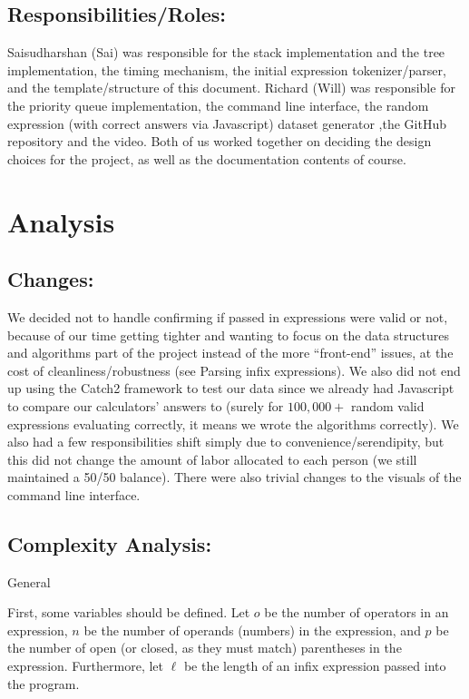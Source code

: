 \documentclass[11pt]{article}
\begin{document}
\subsection*{Responsibilities/Roles:}
Saisudharshan (Sai) was responsible for the stack implementation and the tree implementation, the timing mechanism, the initial expression tokenizer/parser, and the template/structure of this document.
Richard (Will) was responsible for the priority queue implementation, the command line interface, the random expression (with correct answers via Javascript) dataset generator ,the GitHub repository and the video.
Both of us worked together on deciding the design choices for the project, as well as the documentation contents of course.

\noindent\makebox[\linewidth]{\rule{19.1cm}{0.4pt}}

\section*{Analysis}

\subsection*{Changes:}
We decided not to handle confirming if passed in expressions were valid or not, because of our time getting tighter and wanting to focus on the data structures and algorithms part of the project instead of the more ``front-end'' issues, at the cost of cleanliness/robustness (see Parsing infix expressions).
We also did not end up using the Catch2 framework to test our data since we already had Javascript to compare our calculators' answers to (surely for $100,000+$ random valid expressions evaluating correctly, it means we wrote the algorithms correctly).
We also had a few responsibilities shift simply due to convenience/serendipity, but this did not change the amount of labor allocated to each person (we still maintained a 50/50 balance).
There were also trivial changes to the visuals of the command line interface.

\subsection*{Complexity Analysis:}

\centerline{General}
First, some variables should be defined.
Let $o$ be the number of operators in an expression, $n$ be the number of operands (numbers) in the expression, and $p$ be the number of open (or closed, as they must match) parentheses in the expression. Furthermore, let $\ell$ be the length of an infix expression passed into the program.
\end{document}
